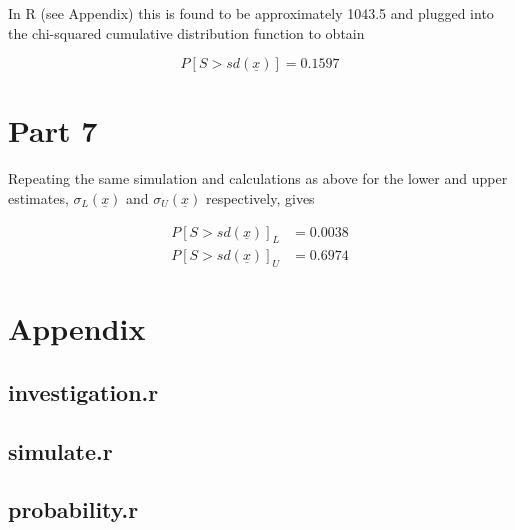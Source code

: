 \documentclass[11pt]{article}
\begin{document}
In R (see Appendix) this is found to be approximately 1043.5 and plugged into the chi-squared cumulative distribution function to obtain

$$ P[S > sd(\underline{x})] = 0.1597 $$

\section*{Part 7}

Repeating the same simulation and calculations as above for the lower and upper estimates, $\sigma_L(\underline{x})$ and $\sigma_U(\underline{x})$ respectively, gives

\begin{align*}
    P[S > sd(\underline{x})]_L &= 0.0038 \\
    P[S > sd(\underline{x})]_U &= 0.6974
\end{align*}

\newpage
\section*{Appendix}
\subsection*{investigation.r}


\subsection*{simulate.r}


\subsection*{probability.r}

\end{document}
